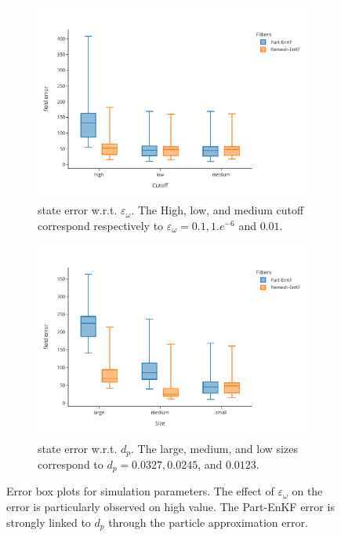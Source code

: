 \begin{figure}[h!]
	\centering

	\begin{subfigure}{0.48\textwidth}
		\centering
		\includegraphics[width=\linewidth]{./images/app2d/final/MSE_cutoff_box.pdf}
		\caption{state error w.r.t. $\varepsilon_{\omega}$. The High, low, and medium cutoff correspond respectively to $\varepsilon_{\omega} = 0.1, 1.e^{-6}$ and $0.01$.}
		\label{fig:cuttoff}
	\end{subfigure}
	\hfill
	\begin{subfigure}{0.48\textwidth}
		\centering
		\includegraphics[width=\linewidth]{./images/app2d/final/MSE_size_box.pdf}
		\caption{state error w.r.t. $d_p$. The large, medium, and low sizes correspond to $d_p = 0.0327, 0.0245$, and $0.0123$.}
		\label{fig:np}
	\end{subfigure}

	\caption{Error box plots for simulation parameters. The effect of $\varepsilon_{\omega}$ on the error is particularly observed on high value. The Part-EnKF error is strongly linked to $d_p$ through the particle approximation error.}
	\label{fig:simu_parameters_error}
\end{figure}

